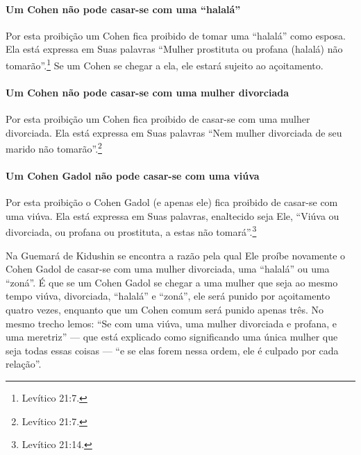 \paragraph{Um Cohen não pode casar-se com uma ``halalá''}

Por esta proibição um Cohen fica proibido de tomar uma
``halalá''\starr{} como esposa. Ela está expressa em Suas
palavras ``Mulher prostituta ou profana (halalá) não tomarão''.\footnote{Levítico
21:7.} Se um Cohen se chegar a ela, ele estará sujeito ao
açoitamento.

\paragraph{Um Cohen não pode casar-se com uma mulher divorciada}

Por esta proibição um Cohen fica proibido de casar-se com uma mulher
divorciada. Ela está expressa em Suas palavras ``Nem mulher divorciada
de seu marido não tomarão''.\footnote{Levítico 21:7.}


\paragraph{Um Cohen Gadol não pode casar-se com uma viúva}

Por esta proibição o Cohen Gadol (e apenas ele) fica proibido de
casar-se com uma viúva. Ela está expressa em Suas palavras, enaltecido
seja Ele, ``Viúva ou divorciada, ou profana ou prostituta, a estas não
tomará''.\footnote{Levítico 21:14.}

Na Guemará de Kidushin se encontra a razão pela qual Ele proíbe
novamente o Cohen Gadol de casar-se com uma mulher divorciada, uma
``halalá'' ou uma ``zoná''. É que se um Cohen Gadol se chegar a uma
mulher que seja ao mesmo tempo viúva, divorciada, ``halalá'' e ``zoná'',
ele será punido por açoitamento quatro vezes, enquanto que um Cohen
comum será punido apenas três. No mesmo trecho lemos: ``Se com uma
viúva, uma mulher divorciada e profana, e uma meretriz'' --- que está
explicado como significando uma única mulher que seja todas essas
coisas --- ``e se elas forem nessa ordem, ele é culpado por cada
relação''.

